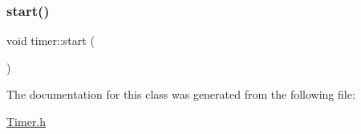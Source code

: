 \hypertarget{classtimer_a9aa894a57748b2bdf3adce46f5736794}{}\label{classtimer_a9aa894a57748b2bdf3adce46f5736794} 
\subsubsection{\texorpdfstring{start()}{start()}}
{\footnotesize\ttfamily void timer\+::start (\begin{DoxyParamCaption}{ }\end{DoxyParamCaption})\hspace{0.3cm}{\ttfamily [inline]}}



The documentation for this class was generated from the following file\+:\begin{DoxyCompactItemize}
\item 
\hyperlink{Timer_8h}{Timer.\+h}\end{DoxyCompactItemize}
